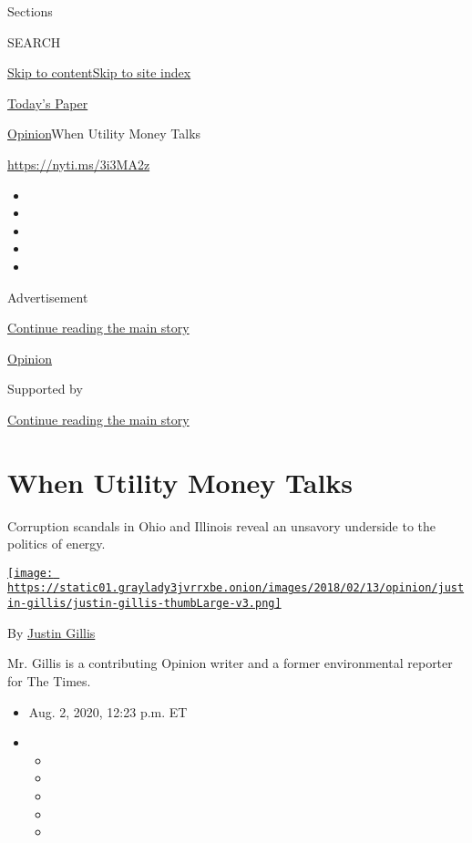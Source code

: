 Sections

SEARCH

\protect\hyperlink{site-content}{Skip to
content}\protect\hyperlink{site-index}{Skip to site index}

\href{https://myaccount.nytimes3xbfgragh.onion/auth/login?response_type=cookie\&client_id=vi}{}

\href{https://www.nytimes3xbfgragh.onion/section/todayspaper}{Today's
Paper}

\href{/section/opinion}{Opinion}\textbar{}When Utility Money Talks

\url{https://nyti.ms/3i3MA2z}

\begin{itemize}
\item
\item
\item
\item
\item
\end{itemize}

Advertisement

\protect\hyperlink{after-top}{Continue reading the main story}

\href{/section/opinion}{Opinion}

Supported by

\protect\hyperlink{after-sponsor}{Continue reading the main story}

\hypertarget{when-utility-money-talks}{%
\section{When Utility Money Talks}\label{when-utility-money-talks}}

Corruption scandals in Ohio and Illinois reveal an unsavory underside to
the politics of energy.

\href{https://www.nytimes3xbfgragh.onion/by/justin-gillis}{\texttt{[image: https://static01.graylady3jvrrxbe.onion/images/2018/02/13/opinion/justin-gillis/justin-gillis-thumbLarge-v3.png]}}

By \href{https://www.nytimes3xbfgragh.onion/by/justin-gillis}{Justin
Gillis}

Mr. Gillis is a contributing Opinion writer and a former environmental
reporter for The Times.

\begin{itemize}
\item
  Aug. 2, 2020, 12:23 p.m. ET
\item
  \begin{itemize}
  \item
  \item
  \item
  \item
  \item
  \end{itemize}
\end{itemize}

